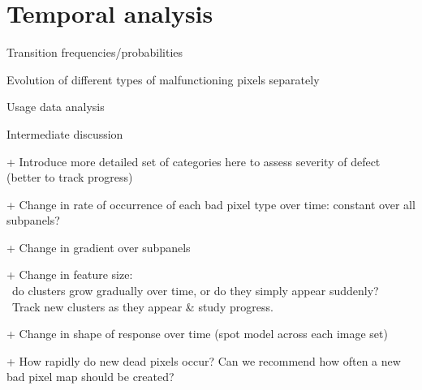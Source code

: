 \documentclass[\main/IO-Pixels.tex]{subfiles}
\begin{document}
\section{Temporal analysis}
\begin{outline}

Transition frequencies/probabilities

Evolution of different types of malfunctioning pixels separately

Usage data analysis

Intermediate discussion

+ Introduce more detailed set of categories here to assess severity of defect (better to track progress)

+ Change in rate of occurrence of each bad pixel type over time: constant over all subpanels?

+ Change in gradient over subpanels

+ Change in feature size: \\ \-\ do clusters grow gradually over time, or do they simply appear suddenly?\\ \-\ Track new clusters as they appear \& study progress.

+ Change in shape of response over time (spot model across each image set)

+ How rapidly do new dead pixels occur? Can we recommend how often a new bad pixel map should be created?
\end{outline}
\end{document}
